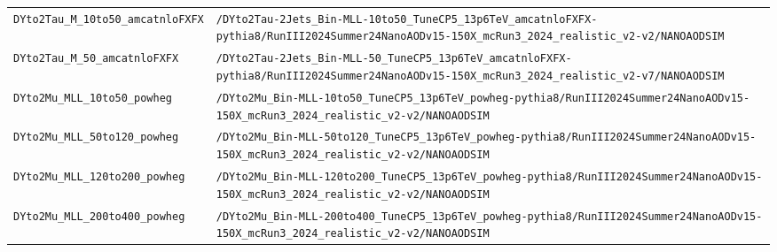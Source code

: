 \begin{longtable}{@{}>{\RaggedRight\arraybackslash}p{} >{\RaggedRight\arraybackslash}p{}@{}}
\addlinespace[2pt]
\texttt{DYto2Tau\_\allowbreak{}M\_\allowbreak{}10to50\_\allowbreak{}amcatnloFXFX} & \texttt{/\allowbreak{}DYto2Tau-\allowbreak{}2Jets\_\allowbreak{}Bin-\allowbreak{}MLL-\allowbreak{}10to50\_\allowbreak{}TuneCP5\_\allowbreak{}13p6TeV\_\allowbreak{}amcatnloFXFX-\allowbreak{}pythia8/\allowbreak{}RunIII2024Summer24NanoAODv15-\allowbreak{}150X\_\allowbreak{}mcRun3\_\allowbreak{}2024\_\allowbreak{}realistic\_\allowbreak{}v2-\allowbreak{}v2/\allowbreak{}NANOAODSIM} \\
\addlinespace[2pt]
\texttt{DYto2Tau\_\allowbreak{}M\_\allowbreak{}50\_\allowbreak{}amcatnloFXFX} & \texttt{/\allowbreak{}DYto2Tau-\allowbreak{}2Jets\_\allowbreak{}Bin-\allowbreak{}MLL-\allowbreak{}50\_\allowbreak{}TuneCP5\_\allowbreak{}13p6TeV\_\allowbreak{}amcatnloFXFX-\allowbreak{}pythia8/\allowbreak{}RunIII2024Summer24NanoAODv15-\allowbreak{}150X\_\allowbreak{}mcRun3\_\allowbreak{}2024\_\allowbreak{}realistic\_\allowbreak{}v2-\allowbreak{}v7/\allowbreak{}NANOAODSIM} \\
\addlinespace[2pt]
\texttt{DYto2Mu\_\allowbreak{}MLL\_\allowbreak{}10to50\_\allowbreak{}powheg} & \texttt{/\allowbreak{}DYto2Mu\_\allowbreak{}Bin-\allowbreak{}MLL-\allowbreak{}10to50\_\allowbreak{}TuneCP5\_\allowbreak{}13p6TeV\_\allowbreak{}powheg-\allowbreak{}pythia8/\allowbreak{}RunIII2024Summer24NanoAODv15-\allowbreak{}150X\_\allowbreak{}mcRun3\_\allowbreak{}2024\_\allowbreak{}realistic\_\allowbreak{}v2-\allowbreak{}v2/\allowbreak{}NANOAODSIM} \\
\addlinespace[2pt]
\texttt{DYto2Mu\_\allowbreak{}MLL\_\allowbreak{}50to120\_\allowbreak{}powheg} & \texttt{/\allowbreak{}DYto2Mu\_\allowbreak{}Bin-\allowbreak{}MLL-\allowbreak{}50to120\_\allowbreak{}TuneCP5\_\allowbreak{}13p6TeV\_\allowbreak{}powheg-\allowbreak{}pythia8/\allowbreak{}RunIII2024Summer24NanoAODv15-\allowbreak{}150X\_\allowbreak{}mcRun3\_\allowbreak{}2024\_\allowbreak{}realistic\_\allowbreak{}v2-\allowbreak{}v2/\allowbreak{}NANOAODSIM} \\
\addlinespace[2pt]
\texttt{DYto2Mu\_\allowbreak{}MLL\_\allowbreak{}120to200\_\allowbreak{}powheg} & \texttt{/\allowbreak{}DYto2Mu\_\allowbreak{}Bin-\allowbreak{}MLL-\allowbreak{}120to200\_\allowbreak{}TuneCP5\_\allowbreak{}13p6TeV\_\allowbreak{}powheg-\allowbreak{}pythia8/\allowbreak{}RunIII2024Summer24NanoAODv15-\allowbreak{}150X\_\allowbreak{}mcRun3\_\allowbreak{}2024\_\allowbreak{}realistic\_\allowbreak{}v2-\allowbreak{}v2/\allowbreak{}NANOAODSIM} \\
\addlinespace[2pt]
\texttt{DYto2Mu\_\allowbreak{}MLL\_\allowbreak{}200to400\_\allowbreak{}powheg} & \texttt{/\allowbreak{}DYto2Mu\_\allowbreak{}Bin-\allowbreak{}MLL-\allowbreak{}200to400\_\allowbreak{}TuneCP5\_\allowbreak{}13p6TeV\_\allowbreak{}powheg-\allowbreak{}pythia8/\allowbreak{}RunIII2024Summer24NanoAODv15-\allowbreak{}150X\_\allowbreak{}mcRun3\_\allowbreak{}2024\_\allowbreak{}realistic\_\allowbreak{}v2-\allowbreak{}v2/\allowbreak{}NANOAODSIM} \\

\end{longtable}
